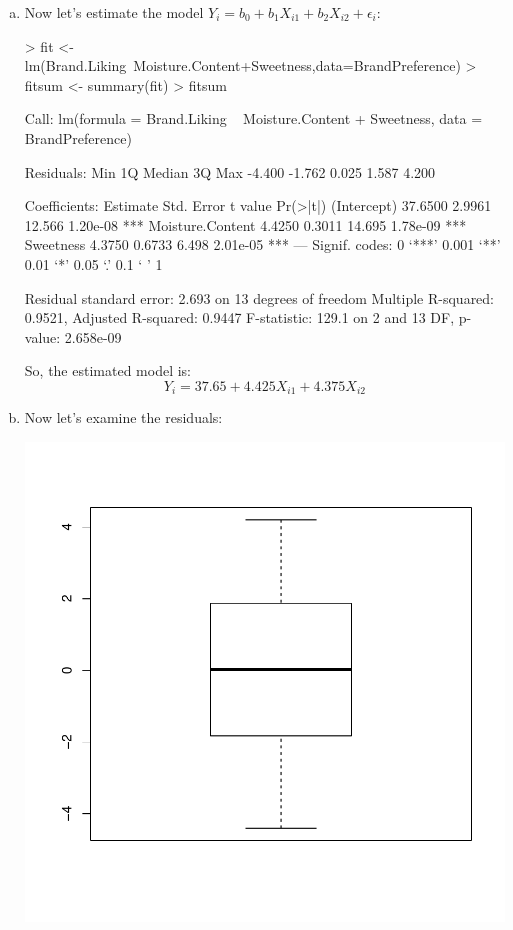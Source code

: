\documentclass{article}
\begin{document}
\begin{enumerate}[a)]
\item{} Now let's estimate the model $Y_i = b_0 + b_1X_{i1} + b_2X_{i2} + \epsilon{}_i$:
\begin{Schunk}
\begin{Sinput}
> fit <- lm(Brand.Liking~Moisture.Content+Sweetness,data=BrandPreference)
> fitsum <- summary(fit)
> fitsum
\end{Sinput}
\begin{Soutput}
Call:
lm(formula = Brand.Liking ~ Moisture.Content + Sweetness, data = BrandPreference)

Residuals:
   Min     1Q Median     3Q    Max 
-4.400 -1.762  0.025  1.587  4.200 

Coefficients:
                 Estimate Std. Error t value Pr(>|t|)    
(Intercept)       37.6500     2.9961  12.566 1.20e-08 ***
Moisture.Content   4.4250     0.3011  14.695 1.78e-09 ***
Sweetness          4.3750     0.6733   6.498 2.01e-05 ***
---
Signif. codes:  0 ‘***’ 0.001 ‘**’ 0.01 ‘*’ 0.05 ‘.’ 0.1 ‘ ’ 1

Residual standard error: 2.693 on 13 degrees of freedom
Multiple R-squared:  0.9521,	Adjusted R-squared:  0.9447 
F-statistic: 129.1 on 2 and 13 DF,  p-value: 2.658e-09
\end{Soutput}
\end{Schunk}

So, the estimated model is:
$$ Y_i = 37.65 + 4.425X_{i1} + 4.375X_{i2} $$

\item{} Now let's examine the residuals:

\begin{Schunk}
\end{Schunk}
\includegraphics{Fig-resids}


\end{enumerate}
\end{document}
